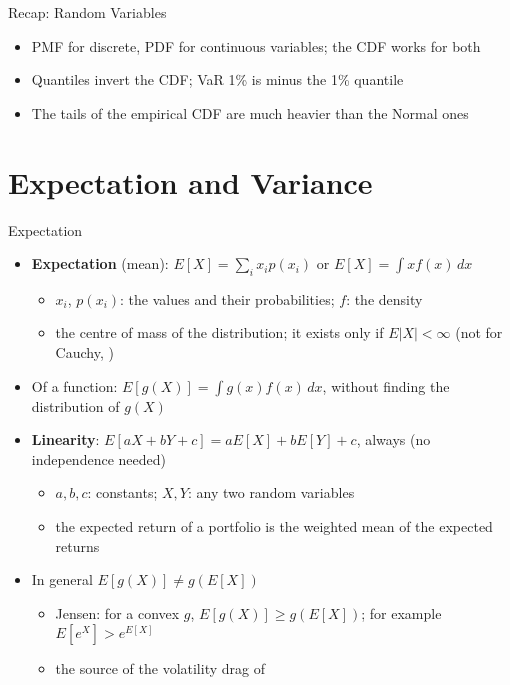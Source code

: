 \begin{frame}{Recap: Random Variables}
\itemsize{\small}
\begin{itemize}
    \item PMF for discrete, PDF for continuous variables; the CDF works for both
    \item Quantiles invert the CDF; VaR 1\% is minus the 1\% quantile
    \item The tails of the empirical CDF are much heavier than the Normal ones
\end{itemize}
\end{frame}


\section{Expectation and Variance}

\begin{frame}{Expectation}
\itemsize{\footnotesize}
\begin{itemize}
    \item \textbf{Expectation} (mean): $E[X] = \sum_i x_i p(x_i)$ or $E[X] = \int x f(x)\,dx$
    \begin{itemize}
        \item $x_i$, $p(x_i)$: the values and their probabilities; $f$: the density
        \item the centre of mass of the distribution; it exists only if $E|X| < \infty$ (not for Cauchy, )
    \end{itemize}
    \item Of a function: $E[g(X)] = \int g(x) f(x)\,dx$, without finding the distribution of $g(X)$
    \item \textbf{Linearity}: $E[aX + bY + c] = aE[X] + bE[Y] + c$, always (no independence needed)
    \begin{itemize}
        \item $a, b, c$: constants; $X, Y$: any two random variables
        \item the expected return of a portfolio is the weighted mean of the expected returns
    \end{itemize}
    \item In general $E[g(X)] \ne g(E[X])$
    \begin{itemize}
        \item Jensen: for a convex $g$, $E[g(X)] \ge g(E[X])$; for example $E[e^X] > e^{E[X]}$
        \item the source of the volatility drag of 
    \end{itemize}
\end{itemize}
\end{frame}

